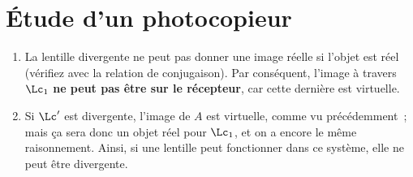 \documentclass[a4paper, 12pt, final, garamond]{book}
\begin{document}
\section{Étude d'un photocopieur}
\begin{enumerate}
    \item La lentille divergente ne peut pas donner une image réelle si l'objet
        est réel (vérifiez avec la relation de conjugaison). Par conséquent,
        l'image à travers $\Lc_1$ \textbf{ne peut pas être sur le récepteur},
        car cette dernière est virtuelle.

    \item Si $\Lc'$ est divergente, l'image de $A$ est virtuelle, comme vu
        précédemment~; mais ça sera donc un objet réel pour $\Lc_1$, et on a
        encore le même raisonnement. Ainsi, si une lentille peut fonctionner
        dans ce système, elle ne peut être divergente.


\end{enumerate}
\end{document}
